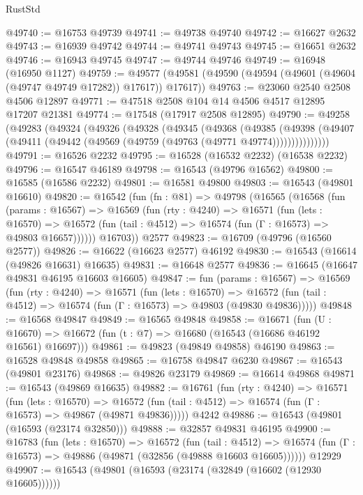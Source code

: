 \begin{lexlean}{RustStd}
\begin{coremodule}
@49740 := @16753 @49739
@49741 := @49738 @49740
@49742 := @16627 @2632
@49743 := @16939 @49742
@49744 := @49741 @49743
@49745 := @16651 @2632
@49746 := @16943 @49745
@49747 := @49744 @49746
@49749 := @16948 (@16950 @1127)
@49759 := @49577 (@49581 (@49590 (@49594 (@49601 (@49604 (@49747 @49749 @17282)) @17617)) @17617))
@49763 := @23060 @2540 @2508 @4506 @12897
@49771 := @47518 @2508 @104 @14 @4506 @4517 @12895 @17207 @21381
@49774 := @17548 (@17917 @2508 @12895)
@49790 := @49258
    (@49283
      (@49324
        (@49326
          (@49328
            (@49345
              (@49368
                (@49385
                  (@49398
                    (@49407 (@49411 (@49442 (@49569 (@49759 (@49763 (@49771 @49774)))))))))))))))
@49791 := @16526 @2232
@49795 := @16528 (@16532 @2232) (@16538 @2232)
@49796 := @16547 @46189
@49798 := @16543 (@49796 @16562)
@49800 := @16585 (@16586 @2232)
@49801 := @16581 @49800
@49803 := @16543 (@49801 @16610)
@49820 := @16542
    (fun (fn : @81) =>
    @49798
      (@16565
        (@16568
          (fun (params : @16567) =>
          @16569
            (fun (rty : @4240) =>
            @16571
              (fun (lets : @16570) =>
              @16572 (fun (tail : @4512) => @16574 (fun (Γ : @16573) => @49803 @16657))))))
        @16703))
    @2577
@49823 := @16709 (@49796 (@16560 @2577))
@49826 := @16622 (@16623 @2577) @46192
@49830 := @16543 (@16614 (@49826 @16631) @16635)
@49831 := @16648 @2577
@49836 := @16645 (@16647 @49831 @46195 @16603 @16605)
@49847 := fun (params : @16567) =>
  @16569
    (fun (rty : @4240) =>
    @16571
      (fun (lets : @16570) =>
      @16572 (fun (tail : @4512) => @16574 (fun (Γ : @16573) => @49803 (@49830 @49836)))))
@49848 := @16568 @49847
@49849 := @16565 @49848
@49858 := @16671
    (fun (U : @16670) => @16672 (fun (t : @7) => @16680 (@16543 (@16686 @46192 @16561) @16697)))
@49861 := @49823 (@49849 @49858) @46190
@49863 := @16528 @49848 @49858
@49865 := @16758 @49847 @6230
@49867 := @16543 (@49801 @23176)
@49868 := @49826 @23179
@49869 := @16614 @49868
@49871 := @16543 (@49869 @16635)
@49882 := @16761
    (fun (rty : @4240) =>
    @16571
      (fun (lets : @16570) =>
      @16572 (fun (tail : @4512) => @16574 (fun (Γ : @16573) => @49867 (@49871 @49836)))))
    @4242
@49886 := @16543 (@49801 (@16593 (@23174 @32850)))
@49888 := @32857 @49831 @46195
@49900 := @16783
    (fun (lets : @16570) =>
    @16572
      (fun (tail : @4512) =>
      @16574 (fun (Γ : @16573) => @49886 (@49871 (@32856 (@49888 @16603 @16605))))))
    @12929
@49907 := @16543 (@49801 (@16593 (@23174 (@32849 (@16602 (@12930 @16605))))))

\end{coremodule}
\end{lexlean}
